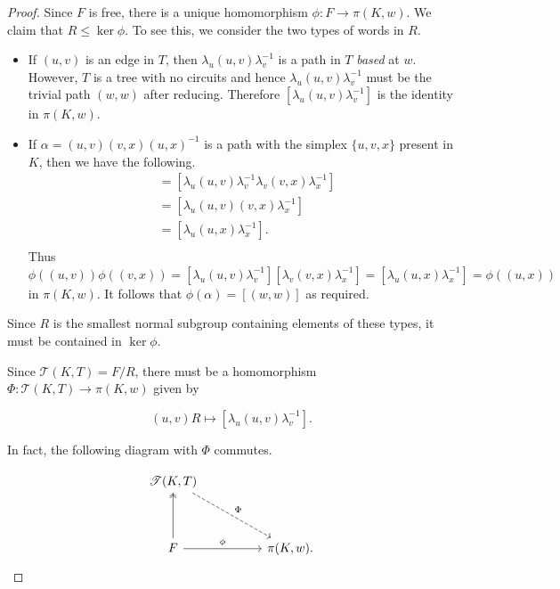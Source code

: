 \begin{proof}
Since $F$ is free, there is a unique homomorphism $\phi: F \rightarrow \pi(K,w)$. We claim that $R \leq \ker \phi$. To see this, we consider the two types of words in $R$.
\begin{itemize}
\item If $(u,v)$ is an edge in $T$, then $\lambda_u (u,v) \lambda_v^{-1}$ is a path in $T$ \emph{based} at $w$. However, $T$ is a tree with no circuits and hence $\lambda_u (u,v) \lambda_v^{-1}$ must be the trivial path $(w,w)$ after reducing. Therefore $[\lambda_u (u,v) \lambda_v^{-1}]$ is the identity in $\pi(K,w)$.
\item If $\alpha = (u,v)(v,x)(u,x)^{-1}$ is a path with the simplex $\{ u,v,x \}$ present in $K$, then we have the following.
  \begin{align*}
    [\lambda_u (u,v) \lambda_v^{-1}][\lambda_v (v,x) \lambda_x^{-1}] &= [\lambda_u (u,v) \lambda_v^{-1}\lambda_v (v,x) \lambda_x^{-1}] \\
                                                                     &= [\lambda_u (u,v)(v,x) \lambda_x^{-1}] \\
                                                                     &= [\lambda_u (u,x) \lambda_x^{-1}]. \\
  \end{align*}
  Thus $\phi((u,v))\phi((v,x)) = [\lambda_u (u,v) \lambda_v^{-1}][\lambda_v (v,x) \lambda_x^{-1}] = [\lambda_u (u,x) \lambda_x^{-1}] = \phi((u,x))$ in $\pi(K,w)$. It follows that $\phi(\alpha) = [(w,w)]$ as required.
\end{itemize}
Since $R$ is the smallest normal subgroup containing elements of these types, it must be contained in $\ker \phi$.

Since $\mathcal{T}(K,T) = F/R$, there must be a homomorphism $\Phi: \mathcal{T}(K,T) \rightarrow \pi(K,w)$ given by

\begin{equation*}
  (u,v)R \mapsto [\lambda_u (u,v) \lambda_v^{-1}].
\end{equation*}

In fact, the following diagram with $\Phi$ commutes.

\begin{equation*}
  \begin{tikzcd}[ampersand replacement=\&, sep=huge]
    \mathcal{T}(K,T) \arrow[dr,dashrightarrow,"\Phi"] \\
    F \arrow[u,twoheadrightarrow] \arrow[r,"\phi"] \& \pi(K,w).
  \end{tikzcd}
\end{equation*}


\end{proof}
